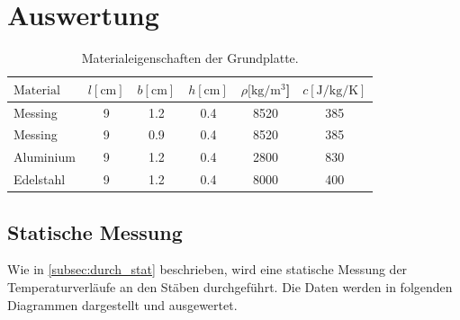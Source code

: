 \section{Auswertung}
\label{sec:Auswertung}

\begin{table}
  \centering
  \caption{Materialeigenschaften der Grundplatte. \cite{V204}}
  \label{tab:1}
  \begin{tabular}{l S S S S S }
    \toprule
    {$\text{Material}$} & {$l [\si{\centi\meter}]$} & {$b [ \si{\centi\metre}]$} & {$h[\si{\centi\metre}]$} & {$\rho [\si{\kilo\gram\per\metre\tothe{3}}$]} & {$c [\si{\joule\per\kilo\gram\per\kelvin}]$} \\
    \midrule
    Messing  & 9 & 1.2 & 0.4 & 8520 & 385 \\
    Messing  & 9 & 0.9 & 0.4 & 8520 & 385 \\
    Aluminium  & 9 & 1.2 & 0.4 & 2800 & 830 \\
    Edelstahl  & 9 & 1.2 & 0.4 & 8000 & 400 \\
    \bottomrule
  \end{tabular}
\end{table}


\subsection{Statische Messung}
\label{subsec:aus_stat}
Wie in \autoref{subsec:durch_stat} beschrieben, wird eine statische Messung der Temperaturverläufe an den Stäben durchgeführt. 
Die Daten werden in folgenden Diagrammen dargestellt und ausgewertet.

